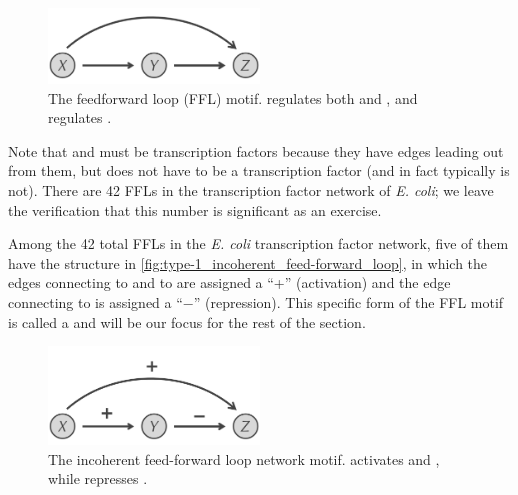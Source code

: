 \begin{figure}[h]
\centering
\mySfFamily
\includegraphics[width = 0.5\textwidth]{../images/feed-forward_loop.png}
\caption{The feedforward loop (FFL) motif.  regulates both  and , and  regulates .}
\label{fig:feed-forward_loop}
\end{figure}

Note that  and  must be transcription factors because they have edges leading out from them, but  does not have to be a transcription factor (and in fact typically is not). There are 42 FFLs in the transcription factor network of \textit{E. coli}; we leave the verification that this number is significant as an exercise.

Among the 42 total FFLs in the \textit{E. coli} transcription factor network, five of them have the structure in \autoref{fig:type-1_incoherent_feed-forward_loop}, in which the edges connecting  to  and  to  are assigned a ``+'' (activation) and the edge connecting  to  is assigned a ``$-$'' (repression). This specific form of the FFL motif is  called a  and will be our focus for the rest of the section.\\

\begin{qbox}\end{qbox}

\begin{figure}[h]
\centering
\mySfFamily
\includegraphics[width = 0.5\textwidth]{../images/type-1_incoherent_feed-forward_loop.png}
\caption{The incoherent feed-forward loop network motif.  activates  and , while  represses .}
\label{fig:type-1_incoherent_feed-forward_loop}
\end{figure}

